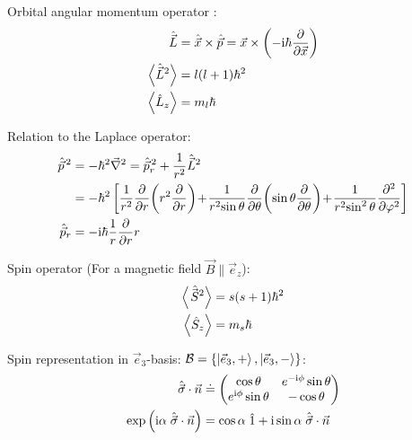 		\noindent
		Orbital angular momentum operator :
		\begin{equation}
			\begin{aligned}
				\hat{\vec{L}} &= \hat{\vec{x}}\times \hat{\vec{p}} = \vec{x}\times\left(-\mathrm{i}\hbar\frac{\partial }{\partial \vec{x}}\right) \\
				\left< \hat{\vec{L}}^2 \right> &= l(l+1)\hbar^2 \\
				\left< \hat{L}_z \right> &= m_l \hbar \\
			\end{aligned}
		\end{equation}

		\noindent
		Relation to the Laplace operator:
		\begin{equation}
			\begin{aligned}
				\hat{\vec{p}}^{\,2} &= -\hbar^2 \Nabla^2 = \hat{\vec{p}}_r^{\,2} + \frac{1}{r^2} \hat{\vec{L}}^2 \\
				&= -\hbar^2 \rBr{{\displaystyle \frac{1}{r^{2}} \frac{\partial }{\partial r}\!\left(r^{2}\frac{\partial }{\partial r}\right)\!+\!\frac{1}{r^{2}\!\sin \theta } \frac{\partial }{\partial \theta }\!\left(\sin \theta \frac{\partial }{\partial \theta }\right)\!+\!\frac{1}{r^{2}\!\sin ^{2}\theta }\frac{\partial ^{2}}{\partial \varphi ^{2}}}}\\
				\hat{\vec{p}}_r &= -\i\hbar\frac{1}{r}\pder{}{r}r \\
			\end{aligned}
		\end{equation}

		\noindent
		Spin operator  (For a magnetic field $\vec{B}\parallel\vec{e}_z$):
		\begin{equation}
			\begin{aligned}
				\left<\hat{\pvec{S}}^2\right> &= s(s+1)\hbar^2 \\
				\left<\hat{S}_z\right> &= m_s \hbar \\
			\end{aligned}
		\end{equation}

		\noindent
		Spin representation in $\vec{e}_3$-basis: $\mathcal{B} = \{ \Ket{\vec{e}_3,+}, \Ket{\vec{e}_3,-} \}$:
		\begin{equation}
			\begin{aligned}
				\hat{\vec{\sigma}} \cdot \vec{n} &\doteq
				\left( \begin{matrix}
					\cos\theta & e^{-\mathrm{i}\phi}\sin\theta \\
					e^{\mathrm{i}\phi}\sin\theta & -\cos\theta \\
				\end{matrix} \right) \\
				\exp\left( \mathrm{i}\alpha \; \hat{\vec{\sigma}} \cdot \vec{n} \right) &= \cos\alpha \;\hat{1} + \mathrm{i}\sin\alpha \; \hat{\vec{\sigma}} \cdot \vec{n} \\
			\end{aligned}
		\end{equation}

